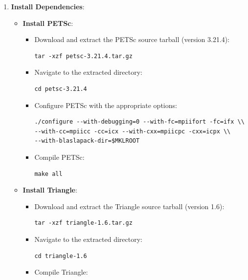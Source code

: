 \documentclass[a4paper,12pt]{article}
\begin{document}
\begin{enumerate}
    \item \textbf{Install Dependencies}:
          \begin{itemize}
              \item \textbf{Install PETSc}:
                    \begin{itemize}
                        \item Download and extract the PETSc source tarball (version 3.21.4):
                              \begin{verbatim}
tar -xzf petsc-3.21.4.tar.gz
                    \end{verbatim}
                        \item Navigate to the extracted directory:
                              \begin{verbatim}
cd petsc-3.21.4
                    \end{verbatim}
                        \item Configure PETSc with the appropriate options:
                              \begin{verbatim}
./configure --with-debugging=0 --with-fc=mpiifort -fc=ifx \\
--with-cc=mpiicc -cc=icx --with-cxx=mpiicpc -cxx=icpx \\
--with-blaslapack-dir=$MKLROOT
                    \end{verbatim}
                        \item Compile PETSc:
                              \begin{verbatim}
make all
                    \end{verbatim}
                    \end{itemize}
              \item \textbf{Install Triangle}:
                    \begin{itemize}
                        \item Download and extract the Triangle source tarball (version 1.6):
                              \begin{verbatim}
tar -xzf triangle-1.6.tar.gz
                    \end{verbatim}
                        \item Navigate to the extracted directory:
                              \begin{verbatim}
cd triangle-1.6
                    \end{verbatim}
                        \item Compile Triangle:

\end{itemize}
\end{itemize}
\end{enumerate}
\end{document}
